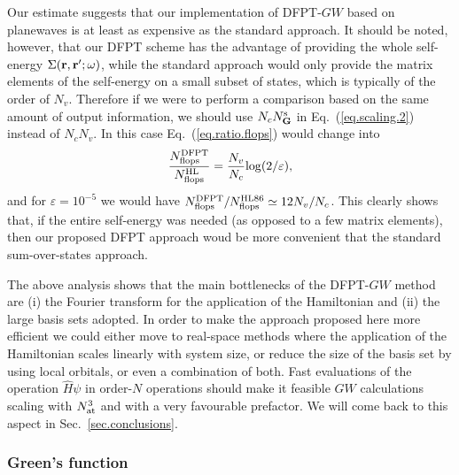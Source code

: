 \documentclass[twocolumn,prb,showpacs,superscriptaddress]{revtex4}
\def\w{\omega}
\def\G{{\bf G}}
\def\r{{\bf r}}
\def\rp{{\bf r^\prime}}
\begin{document}
Our estimate suggests that our implementation of DFPT-$GW$ 
based on planewaves is at least as expensive as the standard approach.
It should be noted, however, that our DFPT scheme has the advantage of providing
the whole self-energy $\Sigma(\r,\rp;\w)$, while the standard approach would 
only provide the matrix elements of the self-energy on a small subset of states, which is
typically of the order of $N_v$. Therefore if we were to perform a comparison based on the
same amount of output information, we should use $N_c N_\G^{\rm s}$ in Eq.\ (\ref{eq.scaling.2})
instead of $N_c N_v$. In this case Eq.\ (\ref{eq.ratio.flops}) would change into
  \begin{equation}
  \frac{N^{\rm DFPT}_{\rm flops}}{N^{\rm HL}_{\rm flops}} = \frac{N_v }{N_c}{\rm log}(2/\varepsilon),
  \end{equation}
and for $\varepsilon=10^{-5}$ we would have $N^{\rm DFPT}_{\rm flops}/N^{\rm HL86}_{\rm flops}\simeq 12 N_v/N_c$.
This clearly shows that, if the entire self-energy was needed (as opposed to a few matrix elements),
then our proposed DFPT approach woud be more convenient that the standard sum-over-states
approach.

The above analysis shows that the main bottlenecks of the DFPT-$GW$ method 
are (i) the Fourier transform for the application of the Hamiltonian and (ii) the large basis sets adopted.
In order to make the approach proposed here more efficient we could either
move to real-space methods where the application of the Hamiltonian scales linearly with system size,\cite{chelikowsky}
or reduce the size of the basis set by using local orbitals,\cite{siesta} or even a combination of both.
Fast evaluations of the operation $\hat{H}\psi$ in order-$N$ operations should 
make it feasible $GW$ calculations scaling with $N_{\rm at}^3$ and with a very favourable
prefactor. We will come back to this aspect in Sec.\ \ref{sec.conclusions}.

\subsubsection{Green's function}\label{sec.green.scaling}
\end{document}
